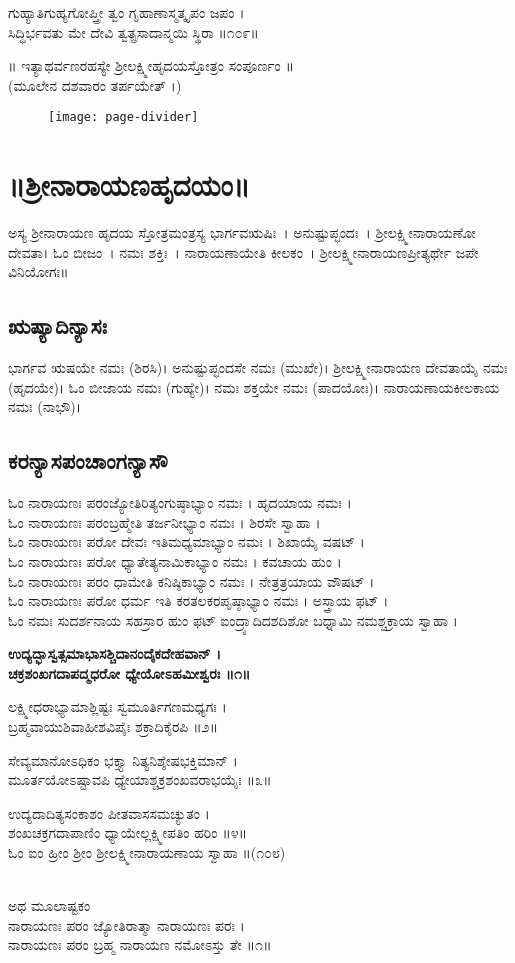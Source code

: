 	ಗುಹ್ಯಾತಿಗುಹ್ಯಗೋಪ್ತ್ರೀ ತ್ವಂ ಗೃಹಾಣಾಸ್ಮತ್ಕೃಪಂ ಜಪಂ ।\\
	ಸಿದ್ಧಿರ್ಭವತು ಮೇ ದೇವಿ ತ್ವತ್ಪ್ರಸಾದಾನ್ಮಯಿ ಸ್ಥಿರಾ ॥೧೦೯॥

	॥ ಇತ್ಯಾಥರ್ವಣರಹಸ್ಯೇ ಶ್ರೀಲಕ್ಷ್ಮೀಹೃದಯಸ್ತೋತ್ರಂ ಸಂಪೂರ್ಣಂ ॥\\
	(ಮೂಲೇನ ದಶವಾರಂ ತರ್ಪಯೇತ್ ।)
\begin{figure}[b] \centering \texttt{[image: page-divider]} \end{figure}
\chapter*{\center ॥ಶ್ರೀನಾರಾಯಣಹೃದಯಂ॥}
ಅಸ್ಯ ಶ್ರೀನಾರಾಯಣ ಹೃದಯ ಸ್ತೋತ್ರಮಂತ್ರಸ್ಯ ಭಾರ್ಗವಋಷಿಃ~। ಅನುಷ್ಟುಪ್ಛಂದಃ~। ಶ್ರೀಲಕ್ಷ್ಮೀನಾರಾಯಣೋ ದೇವತಾ।
ಓಂ ಬೀಜಂ~। ನಮಃ ಶಕ್ತಿಃ~। ನಾರಾಯಣಾಯೇತಿ ಕೀಲಕಂ~। ಶ್ರೀಲಕ್ಷ್ಮೀನಾರಾಯಣಪ್ರೀತ್ಯರ್ಥೇ ಜಪೇ ವಿನಿಯೋಗಃ॥
\thispagestyle{empty}
\section{ಋಷ್ಯಾದಿನ್ಯಾಸಃ}
ಭಾರ್ಗವ ಋಷಯೇ ನಮಃ (ಶಿರಸಿ)। ಅನುಷ್ಟುಪ್ಛಂದಸೇ ನಮಃ (ಮುಖೇ)। ಶ್ರೀಲಕ್ಷ್ಮೀನಾರಾಯಣ ದೇವತಾಯೈ ನಮಃ (ಹೃದಯೇ)। ಓಂ ಬೀಜಾಯ ನಮಃ (ಗುಹ್ಯೇ)। ನಮಃ ಶಕ್ತಯೇ ನಮಃ (ಪಾದಯೋಃ)। ನಾರಾಯಣಾಯಕೀಲಕಾಯ ನಮಃ (ನಾಭೌ)।
\newpage
\section{ಕರನ್ಯಾಸಪಂಚಾಂಗನ್ಯಾಸೌ}
ಓಂ ನಾರಾಯಣಃ ಪರಂಜ್ಯೋತಿರಿತ್ಯಂಗುಷ್ಠಾಭ್ಯಾಂ ನಮಃ । ಹೃದಯಾಯ ನಮಃ ।\\
ಓಂ ನಾರಾಯಣಃ ಪರಂಬ್ರಹ್ಮೇತಿ ತರ್ಜನೀಭ್ಯಾಂ ನಮಃ । ಶಿರಸೇ ಸ್ವಾಹಾ ।\\
ಓಂ ನಾರಾಯಣಃ ಪರೋ ದೇವಃ ಇತಿಮಧ್ಯಮಾಭ್ಯಾಂ ನಮಃ । ಶಿಖಾಯೈ ವಷಟ್ ।\\
ಓಂ ನಾರಾಯಣಃ ಪರೋ ಧ್ಯಾತೇತ್ಯನಾಮಿಕಾಭ್ಯಾಂ ನಮಃ । ಕವಚಾಯ ಹುಂ ।\\
ಓಂ ನಾರಾಯಣಃ ಪರಂ ಧಾಮೇತಿ ಕನಿಷ್ಠಿಕಾಭ್ಯಾಂ ನಮಃ । ನೇತ್ರತ್ರಯಾಯ ವೌಷಟ್ ।\\
ಓಂ ನಾರಾಯಣಃ ಪರೋ ಧರ್ಮ ಇತಿ ಕರತಲಕರಪೃಷ್ಠಾಭ್ಯಾಂ ನಮಃ । ಅಸ್ತ್ರಾಯ ಫಟ್ ।\\
ಓಂ ನಮಃ ಸುದರ್ಶನಾಯ ಸಹಸ್ರಾರ ಹುಂ ಫಟ್ ಐಂದ್ರ್ಯಾದಿದಶದಿಶೋ ಬಧ್ನಾಮಿ ನಮಶ್ಚಕ್ರಾಯ ಸ್ವಾಹಾ ।

	{\bfseries ಉದ್ಯದ್ಭಾಸ್ವತ್ಸಮಾಭಾಸಶ್ಚಿದಾನಂದೈಕದೇಹವಾನ್ ।\\
	ಚಕ್ರಶಂಖಗದಾಪದ್ಮಧರೋ ಧ್ಯೇಯೋಽಹಮೀಶ್ವರಃ ॥೧॥

ಲಕ್ಷ್ಮೀಧರಾಭ್ಯಾಮಾಶ್ಲಿಷ್ಟಃ ಸ್ವಮೂರ್ತಿಗಣಮಧ್ಯಗಃ ।\\
ಬ್ರಹ್ಮವಾಯುಶಿವಾಹೀಶವಿಪೈಃ ಶಕ್ರಾದಿಕೈರಪಿ ॥೨॥

	ಸೇವ್ಯಮಾನೋಽಧಿಕಂ ಭಕ್ತ್ಯಾ ನಿತ್ಯನಿಶ್ಶೇಷಭಕ್ತಿಮಾನ್ ।\\
	ಮೂರ್ತಯೋಽಷ್ಟಾವಪಿ ಧ್ಯೇಯಾಶ್ಚಕ್ರಶಂಖವರಾಭಯೈಃ ॥೩॥

ಉದ್ಯದಾದಿತ್ಯಸಂಕಾಶಂ ಪೀತವಾಸಸಮಚ್ಯುತಂ ।\\
ಶಂಖಚಕ್ರಗದಾಪಾಣಿಂ ಧ್ಯಾಯೇಲ್ಲಕ್ಷ್ಮೀಪತಿಂ ಹರಿಂ ॥೪॥\\
 ಓಂ ಐಂ ಹ್ರೀಂ ಶ್ರೀಂ ಶ್ರೀಲಕ್ಷ್ಮೀನಾರಾಯಣಾಯ ಸ್ವಾಹಾ ॥(೧೦೮)}\\
ಅಥ ಮೂಲಾಷ್ಟಕಂ\\
	ನಾರಾಯಣಃ ಪರಂ ಜ್ಯೋತಿರಾತ್ಮಾ ನಾರಾಯಣಃ ಪರಃ ।\\
	ನಾರಾಯಣಃ ಪರಂ ಬ್ರಹ್ಮ ನಾರಾಯಣ ನಮೋಽಸ್ತು ತೇ ॥೧॥

